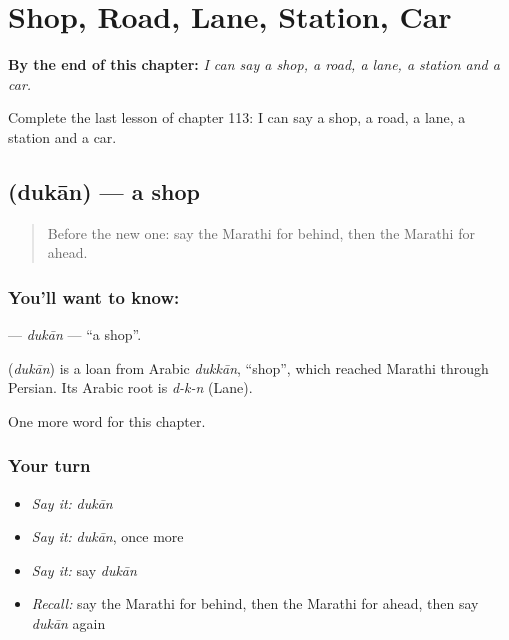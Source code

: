 
\chapter{Shop, Road, Lane, Station, Car}
\label{ch:mr-shop-road-lane-station-car}

\begin{chapteropening}
\textbf{By the end of this chapter:} \emph{I can say a shop, a road, a lane, a station and a car.}

Complete the last lesson of chapter 113: I can say a shop, a road, a lane, a station and a car.
\end{chapteropening}

\section[\texorpdfstring{\mr{दुकान} (dukān)}{दुकान (dukān)}]{ (dukān) — a shop}

\label{lesson:MR-C113-dukan}



\begin{quote}
Before the new one: say the Marathi for behind, then the Marathi for ahead.
\end{quote}

\subsection*{You'll want to know: }
\textbf{} — \emph{dukān} — \textquotedblleft{}a shop\textquotedblright{}.

\begin{cousinweb}
\textbf{} (\emph{dukān}) is a loan from Arabic \emph{dukkān}, \textquotedblleft{}shop\textquotedblright{}, which reached Marathi through Persian. Its Arabic root is \emph{d-k-n} (Lane).
\end{cousinweb}

\begin{grammarlens}[title={What you've built}]
One more word for this chapter.
\end{grammarlens}

\subsection*{Your turn}
\begin{itemize}
\raggedright
  \item \emph{Say it:} \emph{dukān}
  \item \emph{Say it:} \emph{dukān}, once more
  \item \emph{Say it:} say \emph{dukān}
  \item \emph{Recall:} say the Marathi for behind, then the Marathi for ahead, then say \emph{dukān} again
\end{itemize}

